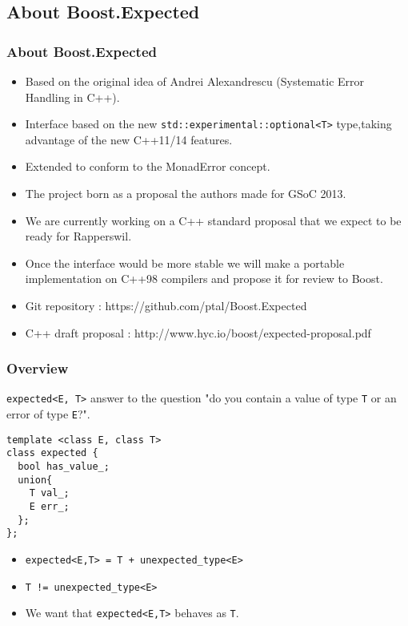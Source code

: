 \documentclass[xcolor=dvipsnames]{beamer}
\newcommand{\cpp}[1]{\lstinline{#1}}
\begin{document}
\subsection{About Boost.Expected}
\begin{frame}
\frametitle{About Boost.Expected}

\begin{itemize}
\item Based on the original idea of Andrei Alexandrescu (Systematic Error Handling in C++).
\item Interface based on the new \cpp{std::experimental::optional<T>} type,taking advantage of the new C++11/14 features.
\item Extended to conform to the MonadError concept.
\item The project born as a proposal the authors made for GSoC 2013.
\item We are currently working on a C++ standard proposal that we expect to be ready for Rapperswil.
\item Once the interface would be more stable we will make a portable implementation on C++98 compilers and propose it for review to Boost.
\end{itemize}

\begin{itemize}
\item Git repository : https://github.com/ptal/Boost.Expected
\item C++ draft proposal : http://www.hyc.io/boost/expected-proposal.pdf
\end{itemize}
\end{frame}
\begin{frame}[fragile]
\frametitle{Overview}

\cpp{expected<E, T>} answer to the question "do you contain a value of type \cpp{T} or an error of type \cpp{E}?".

\begin{lstlisting}
template <class E, class T>
class expected {
  bool has_value_;
  union{ 
    T val_;
    E err_;
  };
};
\end{lstlisting}

\begin{itemize}
\item \cpp{expected<E,T> = T + unexpected_type<E>}
\item \cpp{T != unexpected_type<E>}
\item We want that \cpp{expected<E,T>} behaves as \cpp{T}.
\end{itemize}

\end{frame}
\end{document}
